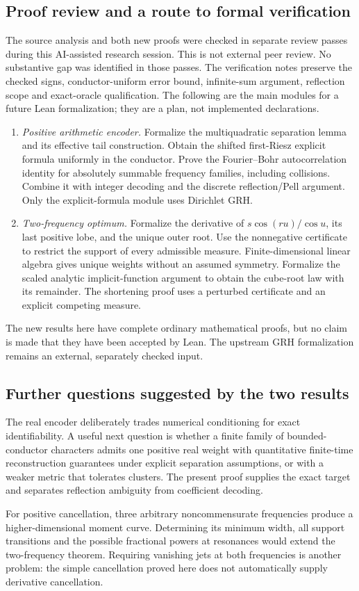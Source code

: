 \subsection{Proof review and a route to formal verification}

The source analysis and both new proofs were checked in separate review
passes during this AI-assisted research session. This is not external
peer review. No substantive gap was identified in those passes. The
verification notes preserve the checked signs, conductor-uniform error
bound, infinite-sum argument, reflection scope and exact-oracle
qualification. The following are the main modules for a future Lean
formalization; they are a plan, not implemented declarations.

\begin{enumerate}
\item \emph{Positive arithmetic encoder.} Formalize the multiquadratic
separation lemma and its effective tail construction. Obtain the shifted
first-Riesz explicit formula uniformly in the conductor. Prove the
Fourier--Bohr autocorrelation identity for absolutely summable frequency
families, including collisions. Combine it with integer decoding and
the discrete reflection/Pell argument. Only the explicit-formula module
uses Dirichlet GRH.
\item \emph{Two-frequency optimum.} Formalize the derivative of
$s\cos(ru)/\cos u$, its last positive lobe, and the unique outer root.
Use the nonnegative certificate to restrict the support of every
admissible measure. Finite-dimensional linear algebra gives unique
weights without an assumed symmetry. Formalize the scaled analytic
implicit-function argument to obtain the cube-root law with its
remainder. The shortening proof uses a perturbed certificate and an
explicit competing measure.
\end{enumerate}

The new results here have complete ordinary mathematical proofs, but no
claim is made that they have been accepted by Lean. The upstream GRH
formalization remains an external, separately checked input.

\subsection{Further questions suggested by the two results}

The real encoder deliberately trades numerical conditioning for exact
identifiability. A useful next question is whether a finite family of
bounded-conductor characters admits one positive real weight with
quantitative finite-time reconstruction guarantees under explicit
separation assumptions, or with a weaker metric that tolerates clusters.
The present proof supplies the exact target and separates reflection
ambiguity from coefficient decoding.

For positive cancellation, three arbitrary noncommensurate frequencies
produce a higher-dimensional moment curve. Determining its minimum
width, all support transitions and the possible fractional powers at
resonances would extend the two-frequency theorem. Requiring vanishing
jets at both frequencies is another problem: the simple cancellation
proved here does not automatically supply derivative cancellation.
